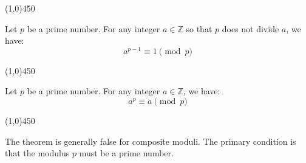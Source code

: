 \begin{center}
    \vspace{10pt}
    \line(1,0){450}
    \vspace{25pt}
\end{center}


\begin{theorem}
Let $p$ be a prime number. For any integer $a \in \mathbb{Z}$ so that $p$ does not divide $a$, we have:
$$
a^{p-1} \equiv 1 \pmod{p}
$$
\end{theorem}

\begin{center}
    \vspace{10pt}
    \line(1,0){450}
    \vspace{25pt}
\end{center}

\begin{theorem}
Let $p$ be a prime number. For any integer $a \in \mathbb{Z}$, we have:
$$
a^p \equiv a \pmod{p}
$$
\end{theorem}

\begin{center}
    \vspace{10pt}
    \line(1,0){450}
    \vspace{25pt}
\end{center}

\begin{remark}
The theorem is generally false for composite moduli. The primary condition is that the modulus $p$ must be a prime number.
\end{remark}

